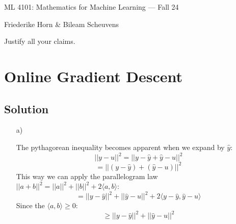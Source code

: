 \documentclass[10pt]{article}
\numberwithin{equation}{section}
\begin{document}
\begin{center}
    \sc ML 4101: Mathematics for Machine Learning --- Fall 24
\end{center}

\noindent Friederike Horn \& Bileam Scheuvens

Justify all your claims.
\section*{Online Gradient Descent}

\subsection*{Solution}

\begin{enumerate}
\item[a)]{
    The pythagorean inequality becomes apparent when we expand by $\hat{y}$:
    $$ ||y-u||^2 = ||y-\hat{y} + \hat{y} - u||^2$$
    $$ = || (y-\hat{y}) + (\hat{y} - u)||^2$$
    This way we can apply the parallelogram law $||a + b||^2 = ||a||^2 + ||b||^2 + 2\langle a,b\rangle $:
    $$= ||y-\hat{y}||^2 + ||\hat{y} - u||^2 + 2\langle y-\hat{y}, \hat{y} -u \rangle$$
    Since the $\langle a,b \rangle \geq 0$:
    $$\geq ||y-\hat{y}||^2 + ||\hat{y} - u||^2 $$

  }


\end{enumerate}
\end{document}
